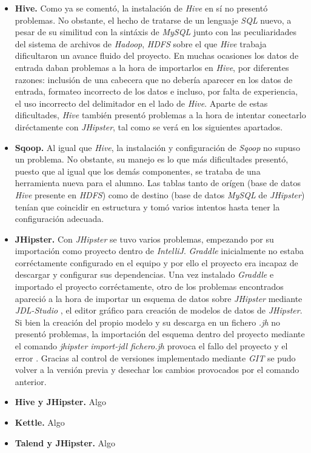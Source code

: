 \begin{itemize}
\item \textbf{Hive.} Como ya se comentó, la instalación de \textit{Hive} en sí no presentó problemas. No obstante, el hecho de tratarse de un lenguaje \textit{SQL} nuevo, a pesar de su similitud con la sintáxis de \textit{MySQL} junto con las peculiaridades del sistema de archivos de \textit{Hadoop}, \textit{HDFS} sobre el que \textit{Hive} trabaja dificultaron un avance fluido del proyecto. En muchas ocasiones los datos de entrada daban problemas a la hora de importarlos en \textit{Hive}, por diferentes razones: inclusión de una cabecera que no debería aparecer en los datos de entrada, formateo incorrecto de los datos e incluso, por falta de experiencia, el uso incorrecto del delimitador en el lado de \textit{Hive}. Aparte de estas dificultades, \textit{Hive} también presentó problemas a la hora de intentar conectarlo diréctamente con \textit{JHipster}, tal como se verá en los siguientes apartados.
\item \textbf{Sqoop.} Al igual que \textit{Hive}, la instalación y configuración de \textit{Sqoop} no supuso un problema. No obstante, su manejo es lo que más dificultades presentó, puesto que al igual que los demás componentes, se trataba de una herramienta nueva para el alumno. Las tablas tanto de orígen (base de datos \textit{Hive} presente en \textit{HDFS}) como de destino (base de datos \textit{MySQL} de \textit{JHipster}) tenían que coincidir en estructura y tomó varios intentos hasta tener la configuración adecuada. 	
\item \textbf{JHipster.} Con \textit{JHipster} se tuvo varios problemas, empezando por su importación como proyecto dentro de \textit{IntelliJ}. \textit{Graddle} inicialmente no estaba corréctamente configurado en el equipo y por ello el proyecto era incapaz de descargar y configurar sus dependencias. Una vez instalado \textit{Graddle} e importado el proyecto corréctamente, otro de los problemas encontrados apareció a la hora de importar un esquema de datos sobre \textit{JHipster} mediante \textit{JDL-Studio} \cite{jdlstudio}, el editor gráfico para creación de modelos de datos de \textit{JHipster}. Si bien la creación del propio modelo y su descarga en un fichero  \textit{.jh} no presentó problemas, la importación del esquema dentro del proyecto mediante el comando \textit{jhipster import-jdl fichero.jh} provoca el fallo del proyecto y el error . Gracias al control de versiones implementado mediante \textit{GIT} \cite{git} se pudo volver a la versión previa y desechar los cambios provocados por el comando anterior. 
\item \textbf{Hive y JHipster.} Algo
\item \textbf{Kettle.} Algo
\item \textbf{Talend y JHipster.} Algo
\end{itemize}





























